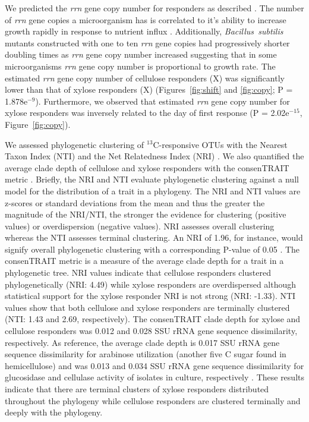 We predicted the \textit{rrn} gene copy number for responders as described
\citep{Kembel_2012}. The number of \textit{rrn} gene copies
a microorganism has is correlated to it's ability to increase growth
rapidly in response to nutrient influx \citep{Klappenbach_2000}.
Additionally, \textit{Bacillus~subtilis} mutants constructed with one to
ten \textit{rrn} gene copies had progressively shorter doubling times as
\textit{rrn} gene copy number increased \citep{yano_multiple_2013}
suggesting that in some microorganisms \textit{rrn} gene copy number is
proportional to growth rate. The estimated \textit{rrn} gene
copy number of cellulose responders (X) was significantly lower than that
of xylose responders (X) (Figures~\ref{fig:shift} and \ref{fig:copy};
P = 1.878e$^{-9}$). Furthermore, we observed that estimated \textit{rrn}
gene copy number for xylose responders was inversely related to the day of
first response (P = 2.02e$^{-15}$, Figure~\ref{fig:copy}).

We assessed phylogenetic clustering of $^{13}$C-responsive OTUs with the
Nearest Taxon Index (NTI) and the Net Relatedness Index (NRI)
\citep{Webb2000}. We also quantified the average clade depth of cellulose and
xylose responders with the consenTRAIT metric \citep{Martiny2013}. Briefly, the
NRI and NTI evaluate phylogenetic clustering against a null model for the
distribution of a trait in a phylogeny. The NRI and NTI values are z-scores or
standard deviations from the mean and thus the greater the magnitude of the
NRI/NTI, the stronger the evidence for clustering (positive values) or
overdispersion (negative values). NRI assesses overall clustering whereas the
NTI assesses terminal clustering. An NRI of 1.96, for instance, would signify
overall phylogenetic clustering with a corresponding P-value of 0.05
\citep{Evans2014a}. The consenTRAIT metric is a measure of the average clade
depth for a trait in a phylogenetic tree. NRI values indicate that cellulose
responders clustered phylogenetically (NRI: 4.49) while xylose responders are
overdispersed although statistical support for the xylose responder NRI is not
strong (NRI: -1.33). NTI values show that both cellulose and xylose responders
are terminally clustered (NTI: 1.43 and 2.69, respectively). The consenTRAIT
clade depth for xylose and cellulose responders was 0.012 and 0.028 SSU rRNA
gene sequence dissimilarity, respectively. As reference, the average clade
depth is
0.017 SSU rRNA gene sequence dissimilarity for arabinose utilization (another
five C sugar found in hemicellulose) and was 0.013 and 0.034 SSU rRNA gene
sequence dissimilarity for glucosidase and cellulase activity of isolates in
culture, respectively \citep{Martiny2013,Berlemont2013}. These results
indicate that there are terminal clusters of xylose responders distributed
throughout the phylogeny while cellulose responders are clustered terminally
and deeply with the phylogeny.
